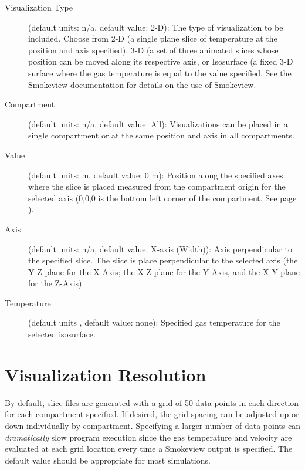 \begin{description}
\item[Visualization Type] (default units: n/a, default value: 2-D): The type of visualization to be included. Choose from 2-D (a single plane slice of temperature at the position and axis specified), 3-D (a set of three animated slices whose position can be moved along its respective axis, or Isosurface (a fixed 3-D surface where the gas temperature is equal to the value specified. See the Smokeview documentation \cite{Smokeview_Users_Guide_6} for details on the use of Smokeview.

\item[Compartment] (default units: n/a, default value: All): Visualizations can be placed in a single compartment or at the same position and axis in all compartments.

\item[Value] (default units: m, default value: 0 m): Position along the specified axes where the slice is placed measured from the compartment origin for the selected axis (0,0,0 is the bottom left corner of the compartment. See page \pageref{Compartment_Geometry}).

\item[Axis] (default units: n/a, default value: X-axis (Width)): Axis perpendicular to the specified slice.  The slice is place perpendicular to the selected axis (the Y-Z plane for the X-Axis; the X-Z plane for the Y-Axis, and the X-Y plane for the Z-Axis)

\item[Temperature] (default units \degc, default value: none): Specified gas temperature for the selected isosurface.
\end{description}


\section{Visualization Resolution}
\label{info:SLCF2}

By default, slice files are generated with a grid of 50 data points in each direction for each compartment specified. If desired, the grid spacing can be adjusted up or down individually by compartment. Specifying a larger number of data points can \textit{dramatically} slow program execution since the gas temperature and velocity are evaluated at each grid location every time a Smokeview output is specified.  The default value should be appropriate for most simulations.


